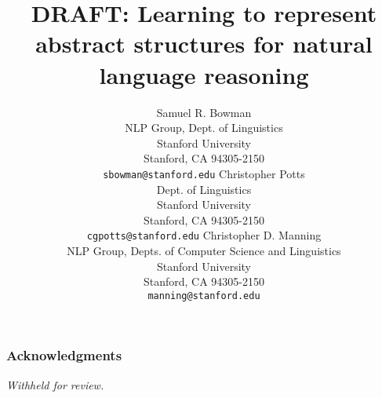 \documentclass{article} %
\title{DRAFT: Learning to represent abstract structures for natural language reasoning}
\author{
Samuel R. Bowman \\
NLP Group, Dept. of Linguistics\\
Stanford University\\
Stanford, CA 94305-2150 \\
\texttt{sbowman@stanford.edu}
 \And
 Christopher Potts \\
Dept. of Linguistics\\
Stanford University\\
Stanford, CA 94305-2150 \\
\texttt{cgpotts@stanford.edu}
 \And
Christopher D. Manning \\
NLP Group,  Depts. of Computer Science and Linguistics\\
Stanford University\\
Stanford, CA 94305-2150 \\
\texttt{manning@stanford.edu}
}
\begin{document}
\maketitle










\subsubsection*{Acknowledgments}

\textit{Withheld for review.}\\ \\



\small %
 
\end{document}
